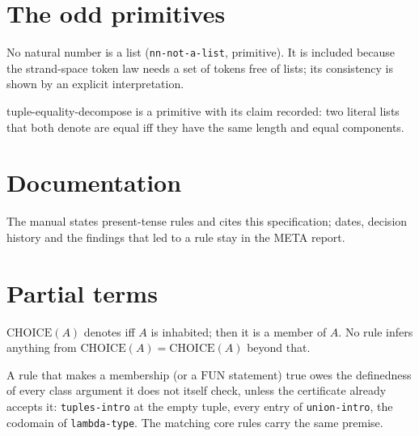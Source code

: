 \section*{The odd primitives}
\begin{description}[style=nextline,leftmargin=1.4cm]
\item[DS-49]\label{ds:49} No natural number is a list (\texttt{nn-not-a-list}, primitive). It is included because the strand-space token law needs a set of tokens free of lists; its consistency is shown by an explicit interpretation.
\item[DS-50]\label{ds:50} tuple-equality-decompose is a primitive with its claim recorded: two literal lists that both denote are equal iff they have the same length and equal components.
\end{description}
\section*{Documentation}
\begin{description}[style=nextline,leftmargin=1.4cm]
\item[DS-51]\label{ds:51} The manual states present-tense rules and cites this specification; dates, decision history and the findings that led to a rule stay in the META report.
\end{description}
\section*{Partial terms}
\begin{description}[style=nextline,leftmargin=1.4cm]
\item[DS-52]\label{ds:52} $\mathrm{CHOICE}(A)$ denotes iff $A$ is inhabited; then it is a member of $A$. No rule infers anything from $\mathrm{CHOICE}(A) = \mathrm{CHOICE}(A)$ beyond that.
\item[DS-53]\label{ds:53} A rule that makes a membership (or a $\mathrm{FUN}$ statement) true owes the definedness of every class argument it does not itself check, unless the certificate already accepts it: \texttt{tuples-intro} at the empty tuple, every entry of \texttt{union-intro}, the codomain of \texttt{lambda-type}. The matching core rules carry the same premise.
\end{description}
